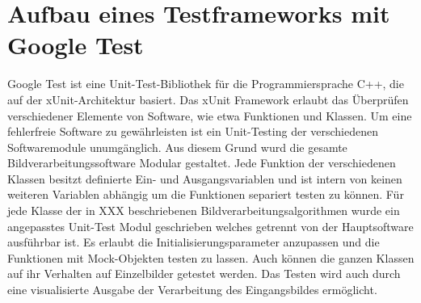 %

\chapter{Aufbau eines Testframeworks mit Google Test}
\label{cha:Aufbau eines Testframeworks mit Google Test} 
%
%

Google Test ist eine Unit-Test-Bibliothek für die Programmiersprache C++, die auf der xUnit-Architektur basiert. Das xUnit Framework erlaubt das \"Uberpr\"ufen verschiedener Elemente von Software, wie etwa Funktionen und Klassen. Um eine fehlerfreie Software zu gew\"ahrleisten ist ein Unit-Testing der verschiedenen Softwaremodule unumg\"anglich.
Aus diesem Grund wurd die gesamte Bildverarbeitungssoftware Modular gestaltet. Jede Funktion der verschiedenen Klassen besitzt definierte Ein- und Ausgangsvariablen und ist intern von keinen weiteren Variablen abh\"angig um die Funktionen separiert testen zu k\"onnen.
Für jede Klasse der in XXX beschriebenen Bildverarbeitungsalgorithmen wurde ein angepasstes Unit-Test Modul geschrieben welches getrennt von der Hauptsoftware ausf\"uhrbar ist. Es erlaubt die Initialisierungsparameter anzupassen und die Funktionen mit Mock-Objekten testen zu lassen. Auch k\"onnen die ganzen Klassen auf ihr Verhalten auf Einzelbilder getestet werden. Das Testen wird auch durch eine visualisierte Ausgabe der Verarbeitung des Eingangsbildes erm\"oglicht.










